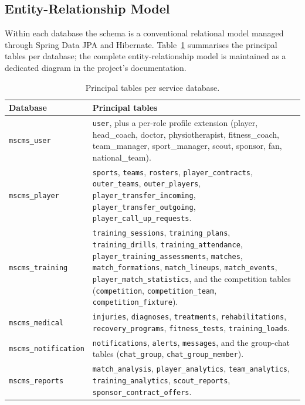 \subsection{Entity-Relationship Model}

Within each database the schema is a conventional relational model managed through
Spring Data JPA and Hibernate. Table~\ref{tab:schema} summarises the principal tables
per database; the complete entity-relationship model is maintained as a dedicated
diagram in the project's documentation.

\begin{table}[htbp]
\centering
\caption{Principal tables per service database.}
\label{tab:schema}
\renewcommand{\arraystretch}{1.3}
\begin{tabular}{|p{}|p{}|}
\hline
\textbf{Database} & \textbf{Principal tables} \\
\hline
\texttt{mscms\_user} & \texttt{user}, plus a per-role profile extension (player, head\_coach, doctor, physiotherapist, fitness\_coach, team\_manager, sport\_manager, scout, sponsor, fan, national\_team). \\
\hline
\texttt{mscms\_player} & \texttt{sports}, \texttt{teams}, \texttt{rosters}, \texttt{player\_contracts}, \texttt{outer\_teams}, \texttt{outer\_players}, \texttt{player\_transfer\_incoming}, \texttt{player\_transfer\_outgoing}, \texttt{player\_call\_up\_requests}. \\
\hline
\texttt{mscms\_training} & \texttt{training\_sessions}, \texttt{training\_plans}, \texttt{training\_drills}, \texttt{training\_attendance}, \texttt{player\_training\_assessments}, \texttt{matches}, \texttt{match\_formations}, \texttt{match\_lineups}, \texttt{match\_events}, \texttt{player\_match\_statistics}, and the competition tables (\texttt{competition}, \texttt{competition\_team}, \texttt{competition\_fixture}). \\
\hline
\texttt{mscms\_medical} & \texttt{injuries}, \texttt{diagnoses}, \texttt{treatments}, \texttt{rehabilitations}, \texttt{recovery\_programs}, \texttt{fitness\_tests}, \texttt{training\_loads}. \\
\hline
\texttt{mscms\_notification} & \texttt{notifications}, \texttt{alerts}, \texttt{messages}, and the group-chat tables (\texttt{chat\_group}, \texttt{chat\_group\_member}). \\
\hline
\texttt{mscms\_reports} & \texttt{match\_analysis}, \texttt{player\_analytics}, \texttt{team\_analytics}, \texttt{training\_analytics}, \texttt{scout\_reports}, \texttt{sponsor\_contract\_offers}. \\
\hline
\end{tabular}
\end{table}

